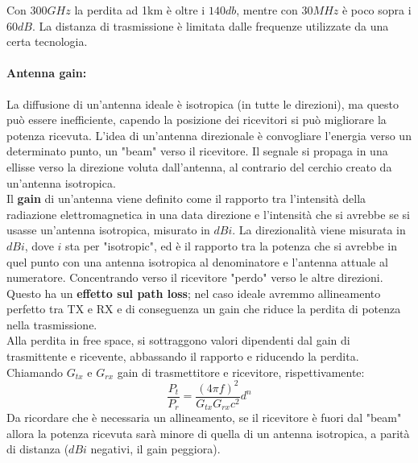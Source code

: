 Con $300GHz$ la perdita ad 1km è oltre i $140db$, mentre con $30MHz$ è poco sopra i $60dB$. La distanza di trasmissione è limitata dalle frequenze utilizzate da una certa tecnologia.\\

\newpage

\paragraph{Antenna gain:} La diffusione di un'antenna ideale è isotropica (in tutte le direzioni), ma questo può essere inefficiente, capendo la posizione dei ricevitori si può migliorare la potenza ricevuta. L'idea di un'antenna direzionale è convogliare l'energia verso un determinato punto, un "beam" verso il ricevitore. Il segnale si propaga in una ellisse verso la direzione voluta dall'antenna, al contrario del cerchio creato da un'antenna isotropica.\\

Il \textbf{gain} di un'antenna viene definito come il rapporto tra l'intensità della radiazione elettromagnetica in una data direzione e l'intensità che si avrebbe se si usasse un'antenna isotropica, misurato in $dBi$. La direzionalità viene misurata in $dBi$, dove $i$ sta per "isotropic", ed è il rapporto tra la potenza che si avrebbe in quel punto con una antenna isotropica al denominatore e l'antenna attuale al numeratore. Concentrando verso il ricevitore "perdo" verso le altre direzioni. \\

Questo ha un \textbf{effetto sul path loss}; nel caso ideale avremmo allineamento perfetto tra TX e RX e di conseguenza un gain che riduce la perdita di potenza nella trasmissione. \\

Alla perdita in free space, si sottraggono valori dipendenti dal gain di trasmittente e ricevente, abbassando il rapporto e riducendo la perdita. Chiamando $G_{tx}$ e $G_{rx}$ gain di trasmettitore e ricevitore, rispettivamente: 
$$ \frac{P_t}{P_r} = \frac{(4 \pi f)^2}{G_{tx} G_{rx} c^2} d^n $$
Da ricordare che è necessaria un allineamento, se il ricevitore è fuori dal "beam" allora la potenza ricevuta sarà minore di quella di un antenna isotropica, a parità di distanza ($dBi$ negativi, il gain peggiora).\\


\newpage

